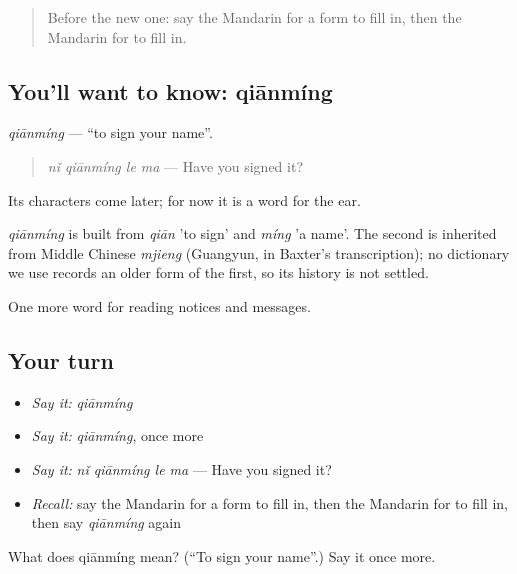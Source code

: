 \label{lesson:ZH-C189-qianming}



\begin{quote}
Before the new one: say the Mandarin for a form to fill in, then the Mandarin for to fill in.
\end{quote}

\subsection*{You'll want to know: qiānmíng}
\emph{qiānmíng} — \textquotedblleft{}to sign your name\textquotedblright{}.

\begin{quote}
\emph{nǐ qiānmíng le ma} — Have you signed it?
\end{quote}

Its characters come later; for now it is a word for the ear.

\begin{cousinweb}
\emph{qiānmíng} is built from \emph{qiān} 'to sign' and \emph{míng} 'a name'. The second is inherited from Middle Chinese \emph{mjieng} (Guangyun, in Baxter's transcription); no dictionary we use records an older form of the first, so its history is not settled.
\end{cousinweb}

\begin{grammarlens}[title={What you've built}]
One more word for reading notices and messages.
\end{grammarlens}

\subsection*{Your turn}
\begin{itemize}
\raggedright
  \item \emph{Say it:} \emph{qiānmíng}
  \item \emph{Say it:} \emph{qiānmíng}, once more
  \item \emph{Say it:} \emph{nǐ qiānmíng le ma} — Have you signed it?
  \item \emph{Recall:} say the Mandarin for a form to fill in, then the Mandarin for to fill in, then say \emph{qiānmíng} again
\end{itemize}

\begin{tcolorbox}[breakable,colback=teal!4,colframe=teal!35!black,title={Before you move on}]
What does qiānmíng mean? (\textquotedblleft{}To sign your name\textquotedblright{}.) Say it once more.
\end{tcolorbox}
